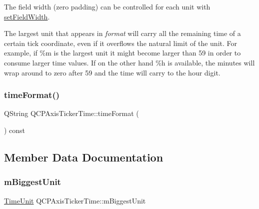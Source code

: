 The field width (zero padding) can be controlled for each unit with \hyperlink{class_q_c_p_axis_ticker_time_adc13e54fc969be98a5c0e3fa0dbaa293}{set\+Field\+Width}.

The largest unit that appears in {\itshape format} will carry all the remaining time of a certain tick coordinate, even if it overflows the natural limit of the unit. For example, if \%m is the largest unit it might become larger than 59 in order to consume larger time values. If on the other hand \%h is available, the minutes will wrap around to zero after 59 and the time will carry to the hour digit. \mbox{\label{class_q_c_p_axis_ticker_time_a99ad61dc7434a7fed1850e96bf748834}} 
\subsubsection{\texorpdfstring{time\+Format()}{timeFormat()}}
{\footnotesize\ttfamily Q\+String Q\+C\+P\+Axis\+Ticker\+Time\+::time\+Format (\begin{DoxyParamCaption}{ }\end{DoxyParamCaption}) const\hspace{0.3cm}{\ttfamily [inline]}}



\subsection{Member Data Documentation}
\mbox{\label{class_q_c_p_axis_ticker_time_a349b2debe07adc591996aa73dec9a757}} 
\subsubsection{\texorpdfstring{m\+Biggest\+Unit}{mBiggestUnit}}
{\footnotesize\ttfamily \hyperlink{class_q_c_p_axis_ticker_time_a5c48ded8c6d3a1aca9b68219469fea3e}{Time\+Unit} Q\+C\+P\+Axis\+Ticker\+Time\+::m\+Biggest\+Unit\hspace{0.3cm}{\ttfamily [protected]}}

